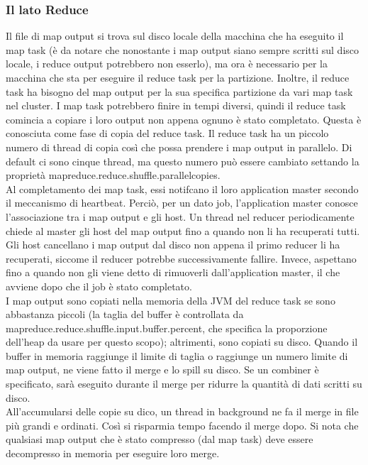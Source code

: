\subsubsection{Il lato Reduce} 
Il file di map output si trova sul disco locale della macchina che ha eseguito il map task (è da notare che nonostante i map output siano sempre scritti sul disco locale, i reduce output potrebbero non esserlo), ma ora è necessario per la macchina che sta per eseguire il reduce task per la partizione. Inoltre, il reduce task ha bisogno del map output per la sua specifica partizione da vari map task nel cluster. I map task potrebbero finire in tempi diversi, quindi il reduce task comincia a copiare i loro output non appena ognuno è stato completato. Questa è conosciuta come fase di copia del reduce task. Il reduce task ha un piccolo numero di thread di copia così che possa prendere i map output in parallelo. Di default ci sono cinque thread, ma questo numero può essere cambiato settando la proprietà mapreduce.reduce.shuffle.parallelcopies. \\
Al completamento dei map task, essi notifcano il loro application master secondo il meccanismo di heartbeat. Perciò, per un dato job, l'application master conosce l'associazione tra i map output e gli host. Un thread nel reducer periodicamente chiede al master gli host del map output fino a quando non li ha recuperati tutti. Gli host cancellano i map output dal disco non appena il primo reducer li ha recuperati, siccome il reducer potrebbe successivamente fallire. Invece, aspettano fino a quando non gli viene detto di rimuoverli dall'application master, il che avviene dopo che il job è stato completato. \\
I map output sono copiati nella memoria della JVM del reduce task se sono abbastanza piccoli (la taglia del buffer è controllata da mapreduce.reduce.shuffle.input.buffer.percent, che specifica la proporzione dell'heap da usare per questo scopo); altrimenti, sono copiati su disco. Quando il buffer in memoria raggiunge il limite di taglia o raggiunge un numero limite di map output, ne viene fatto il merge e lo spill su disco. Se un combiner è specificato, sarà eseguito durante il merge per ridurre la quantità di dati scritti su disco. \\
All'accumularsi delle copie su dico, un thread in background ne fa il merge in file più grandi e ordinati. Così si risparmia tempo facendo il merge dopo. Si nota che qualsiasi map output che è stato compresso (dal map task) deve essere decompresso in memoria per eseguire loro merge. \\
